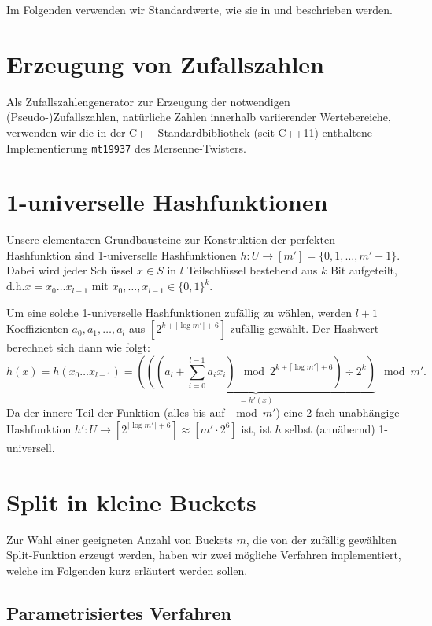 \documentclass[a4paper,12pt,twoside]{report}
\begin{document}
Im Folgenden verwenden wir Standardwerte, wie sie in \cite{Dietzfelbinger2007} und \cite{Botelho2013108} beschrieben werden.

\section{Erzeugung von Zufallszahlen}
\label{sec:zufallszahlen}

Als Zufallszahlengenerator zur Erzeugung der notwendigen (Pseudo-)Zufallszahlen, natürliche Zahlen innerhalb variierender Wertebereiche, verwenden wir die in der C++-Standardbibliothek (seit C++11) enthaltene Implementierung \texttt{mt19937} des Mersenne-Twisters.

\section{1-universelle Hashfunktionen}
\label{sec:einsuniverselleHF}

Unsere elementaren Grundbausteine zur Konstruktion der perfekten Hashfunktion sind 1-universelle Hashfunktionen $h\colon U\to [m']=\{0, 1, \dots, m'-1\}$.
Dabei wird jeder Schlüssel $x\in S$ in $l$ Teilschlüssel bestehend aus $k$ Bit aufgeteilt, d.h.\linebreak $x=x_0\dots x_{l-1}$ mit $x_0, \dots, x_{l-1}\in\{0, 1\}^{k}$.

Um eine solche 1-universelle Hashfunktionen zufällig zu wählen, werden $l+1$ Koeffizienten $a_0, a_1, \dots, a_l$ aus $\left[2^{k+\lceil\log m'\rceil+6}\right]$ zufällig gewählt.
Der Hashwert berechnet sich dann wie folgt:
\[h(x)=h(x_0\dots x_{l-1})=\underbrace{\left(\left(\left(a_l+\sum\limits_{i=0}^{l-1}{a_i x_i}\right)\mod 2^{k+\lceil\log m'\rceil+6}\right)\div 2^k\right)}_{=h'(x)}\mod m'.\]
Da der innere Teil der Funktion (alles bis auf $\mod m'$) eine 2-fach unabhängige Hashfunktion $h'\colon U\to [2^{\lceil\log m'\rceil+6}]\approx[m'\cdot 2^6]$ ist, ist $h$ selbst (annähernd) 1-universell.

\section{Split in kleine Buckets}
Zur Wahl einer geeigneten Anzahl von Buckets $m$, die von der zufällig gewählten Split-Funktion erzeugt werden, haben wir zwei mögliche Verfahren implementiert, welche im Folgenden kurz erläutert werden sollen.

\subsection{Parametrisiertes Verfahren}
\label{sec:splitParametrisiert}
\end{document}
